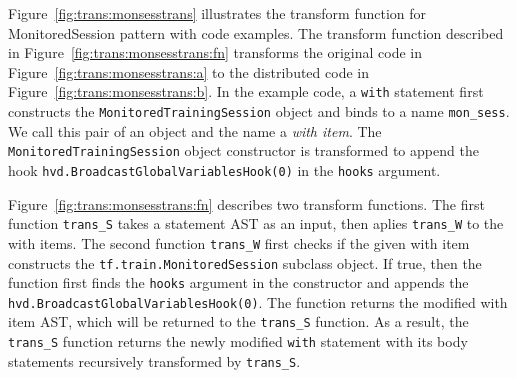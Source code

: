 \begin{inred}
Figure~\ref{fig:trans:monsesstrans} illustrates the transform function for
MonitoredSession pattern with code examples.
The transform function described in Figure~\ref{fig:trans:monsesstrans:fn}
transforms the original code in Figure~\ref{fig:trans:monsesstrans:a}
to the distributed code in Figure~\ref{fig:trans:monsesstrans:b}.
In the example code, a {\tt with} statement first constructs 
the {\tt MonitoredTrainingSession} object and binds to a name {\tt mon\_sess}.
We call this pair of an object and the name a {\it with item}.
The {\tt MonitoredTrainingSession} object constructor is transformed
to append the hook {\tt hvd.BroadcastGlobalVariablesHook(0)} in the {\tt hooks}
argument.

Figure~\ref{fig:trans:monsesstrans:fn} describes two transform functions.
The first function {\tt trans\_S} takes a statement AST as an input,
then aplies {\tt trans\_W} to the with items. 
The second function {\tt trans\_W} first checks if the given with item  
constructs the {\tt tf.train.MonitoredSession} subclass object.
If true, then the function first finds the {\tt hooks} argument
in the constructor and appends the {\tt hvd.BroadcastGlobalVariablesHook(0)}.
The function returns the modified with item AST,
which will be returned to the {\tt trans\_S} function.
As a result, the {\tt trans\_S} function returns the
newly modified {\tt with} statement with its body statements
recursively transformed by {\tt trans\_S}.
\end{inred}

